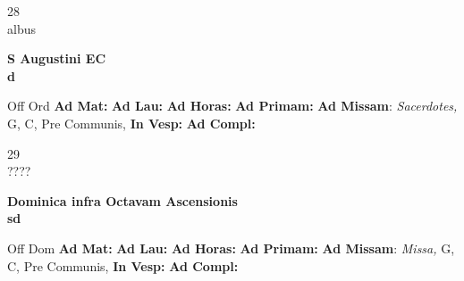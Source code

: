 \documentclass[10pt, openany]{book}
\begin{document}
    \begin{center}
        \begin{minipage}{3.5in}
            \vspace{2em}
            \begin{minipage}{0.5in}
                {\Huge 28} \\
                {\normalsize albus}
            \end{minipage}
            \begin{minipage}{3.0in}
                \textbf{ \large S Augustini EC \\
                \textnormal{\normalsize d}}

            \end{minipage}
            \begin{justify}Off Ord
                \textbf{Ad Mat: }
                \textbf{Ad Lau: }
                \textbf{Ad Horas: }
                \textbf{Ad Primam: }\textbf{Ad Missam}: \textit{Sacerdotes,} G, C, Pre Communis, 
                \textbf{In Vesp: }
                \textbf{Ad Compl: }
            \end{justify}
        \end{minipage}
    \end{center}

    \begin{center}
        \begin{minipage}{3.5in}
            \vspace{2em}
            \begin{minipage}{0.5in}
                {\Huge 29} \\
                {\normalsize ????}
            \end{minipage}
            \begin{minipage}{3.0in}
                \textbf{ \large Dominica infra Octavam Ascensionis \\
                \textnormal{\normalsize sd}}

            \end{minipage}
            \begin{justify}Off Dom
                \textbf{Ad Mat: }
                \textbf{Ad Lau: }
                \textbf{Ad Horas: }
                \textbf{Ad Primam: }\textbf{Ad Missam}: \textit{Missa,} G, C, Pre Communis, 
                \textbf{In Vesp: }
                \textbf{Ad Compl: }
            \end{justify}
        \end{minipage}
    \end{center}
\end{document}
